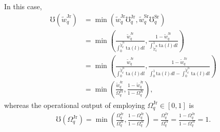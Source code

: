 \documentclass[hidelinks, nonatbib]{elsarticle}
\begin{document}
In this case,
\begin{align}
    \mho(\tilde{w}_{q}^{\text{Jr}})
    &=
    \min\left(
        \tilde{w}_{q}^{\text{Jr}}
        \mho_{q}^{\text{Jr}}
        ,
        \tilde{w}_{q}^{\text{Sr}}
        \mho_{q}^{\text{Sr}}
    \right)
    \\
    &=
    \min\left(
        \frac{
            \tilde{w}_{q}^{\text{Jr}}
        }{
            \int_{0}^{
                \tilde{T}_{q}^{\text{Jr}}
            }{
                \text{ta}(l)
                dl
            }
        }
        ,
        \frac{
            1 - \tilde{w}_{q}^{\text{Jr}}
        }{
            \int_{
                \tilde{T}_{q}^{\text{Jr}}
            }^{1}{
                \text{ta}(l)
                dl
            }
        }
    \right)
    \\
    &=
    \min\left(
        \frac{
            \tilde{w}_{q}^{\text{Jr}}
        }{
            \int_{0}^{
                \tilde{T}_{q}^{\text{Jr}}
            }{
                \text{ta}(l)
                dl
            }
        }
        ,
        \frac{
            1 - \tilde{w}_{q}^{\text{Jr}}
        }{
            \int_{0}^{1}{
                \text{ta}(l)
                dl
            }
            -
            \int_{0}^{
                \tilde{T}_{q}^{\text{Jr}}
            }{
                \text{ta}(l)
                dl
            }
        }
    \right)
    \\
    &=
    \min\left(
        \frac{
            \tilde{w}_{q}^{\text{Jr}}
        }{
            \Omega_{q}^{\text{Jr}}
        }
        ,
        \frac{
            1 - \tilde{w}_{q}^{\text{Jr}}
        }{
            1 - \Omega_{q}^{\text{Jr}}
        }
    \right)
    ,
\end{align}
whereas the operational output of employing $\Omega_{q}^{\text{Jr}} \in [0,1]$ is
\begin{align}
    \mho(\Omega_{q}^{\text{Jr}}) 
    =
    \min\left(
        \frac{
            \Omega_{q}^{\text{Jr}}
        }{
            \Omega_{q}^{\text{Jr}}
        }
        ,
        \frac{
            1 - \Omega_{q}^{\text{Jr}}
        }{
            1 - \Omega_{q}^{\text{Jr}}
        }
    \right)
    =
    \frac{
        \Omega_{q}^{\text{Jr}}
    }{
        \Omega_{q}^{\text{Jr}}
    }
    =
    \frac{
        1 - \Omega_{q}^{\text{Jr}}
    }{
        1 - \Omega_{q}^{\text{Jr}}
    }
    =
    1
    .
\end{align}
\end{document}
